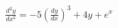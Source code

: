 \documentclass[preview]{standalone}
\begin{document}
\begin{align*}
\frac{d^2y}{dx^2} = - 5 \left(\frac{dy}{dx}\right)^3 + 4y + e^x
\end{align*}
\end{document}

